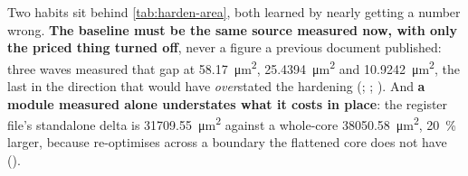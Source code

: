 Two habits sit behind \cref{tab:harden-area}, both learned by nearly
getting a number wrong. \textbf{The baseline must be the same source
measured now, with only the priced thing turned off}, never a figure a
previous document published: three waves measured that gap at
\SI{58.17}{\micro\meter\squared}, \SI{25.4394}{\micro\meter\squared}
and \SI{10.9242}{\micro\meter\squared}, the last in the direction that
would have \emph{over}stated the hardening (;
; ). And \textbf{a module
measured alone understates what it costs in place}: the register file's
standalone delta is \SI{+31709.55}{\micro\meter\squared} against a
whole-core \SI{+38050.58}{\micro\meter\squared}, \SI{20}{\percent}
larger, because  re-optimises across a boundary the flattened
core does not have ().

